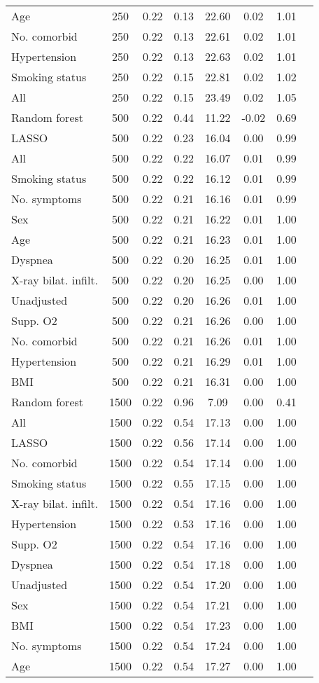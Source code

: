 \documentclass{article}
\begin{document}
{\begin{longtable}{lccccccc}
Age & 250 & 0.22 & 0.13 & 22.60 &  0.02 & 1.01 \\ 
No. comorbid & 250 & 0.22 & 0.13 & 22.61 &  0.02 & 1.01 \\ 
Hypertension & 250 & 0.22 & 0.13 & 22.63 &  0.02 & 1.01 \\ 
Smoking status & 250 & 0.22 & 0.15 & 22.81 &  0.02 & 1.02 \\ 
All & 250 & 0.22 & 0.15 & 23.49 &  0.02 & 1.05 \\ \midrule() 
Random forest & 500 & 0.22 & 0.44 & 11.22 & -0.02 & 0.69 \\ 
LASSO & 500 & 0.22 & 0.23 & 16.04 &  0.00 & 0.99 \\ 
All & 500 & 0.22 & 0.22 & 16.07 &  0.01 & 0.99 \\ 
Smoking status & 500 & 0.22 & 0.22 & 16.12 &  0.01 & 0.99 \\ 
No. symptoms & 500 & 0.22 & 0.21 & 16.16 &  0.01 & 0.99 \\ 
Sex & 500 & 0.22 & 0.21 & 16.22 &  0.01 & 1.00 \\ 
Age & 500 & 0.22 & 0.21 & 16.23 &  0.01 & 1.00 \\ 
Dyspnea & 500 & 0.22 & 0.20 & 16.25 &  0.01 & 1.00 \\ 
X-ray bilat. infilt. & 500 & 0.22 & 0.20 & 16.25 &  0.00 & 1.00 \\ 
Unadjusted & 500 & 0.22 & 0.20 & 16.26 &  0.01 & 1.00 \\ 
Supp. O2 & 500 & 0.22 & 0.21 & 16.26 &  0.00 & 1.00 \\ 
No. comorbid & 500 & 0.22 & 0.21 & 16.26 &  0.01 & 1.00 \\ 
Hypertension & 500 & 0.22 & 0.21 & 16.29 &  0.01 & 1.00 \\ 
BMI & 500 & 0.22 & 0.21 & 16.31 &  0.00 & 1.00 \\ \midrule() 
Random forest & 1500 & 0.22 & 0.96 &  7.09 &  0.00 & 0.41 \\ 
All & 1500 & 0.22 & 0.54 & 17.13 &  0.00 & 1.00 \\ 
LASSO & 1500 & 0.22 & 0.56 & 17.14 &  0.00 & 1.00 \\ 
No. comorbid & 1500 & 0.22 & 0.54 & 17.14 &  0.00 & 1.00 \\ 
Smoking status & 1500 & 0.22 & 0.55 & 17.15 &  0.00 & 1.00 \\ 
X-ray bilat. infilt. & 1500 & 0.22 & 0.54 & 17.16 &  0.00 & 1.00 \\ 
Hypertension & 1500 & 0.22 & 0.53 & 17.16 &  0.00 & 1.00 \\ 
Supp. O2 & 1500 & 0.22 & 0.54 & 17.16 &  0.00 & 1.00 \\ 
Dyspnea & 1500 & 0.22 & 0.54 & 17.18 &  0.00 & 1.00 \\ 
Unadjusted & 1500 & 0.22 & 0.54 & 17.20 &  0.00 & 1.00 \\ 
Sex & 1500 & 0.22 & 0.54 & 17.21 &  0.00 & 1.00 \\ 
BMI & 1500 & 0.22 & 0.54 & 17.23 &  0.00 & 1.00 \\ 
No. symptoms & 1500 & 0.22 & 0.54 & 17.24 &  0.00 & 1.00 \\ 
Age & 1500 & 0.22 & 0.54 & 17.27 &  0.00 & 1.00 \\
\bottomrule
\hline
\end{longtable}
}
\end{document}
